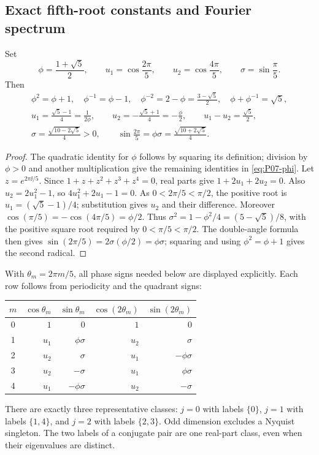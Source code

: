 \subsection{Exact fifth-root constants and Fourier spectrum}
\label{slot:P07-1}
\begin{lemma}
\label{lem:P07-trig}
Set
\begin{equation}
 \phi=\frac{1+\sqrt5}{2},\qquad
 u_1=\cos\frac{2\pi}{5},\qquad u_2=\cos\frac{4\pi}{5},\qquad
 \sigma=\sin\frac\pi5.
 \label{eq:P07-constants}
\end{equation}
Then
\begin{gather}
 \phi^2=\phi+1,\quad \phi^{-1}=\phi-1,\quad
 \phi^{-2}=2-\phi=\frac{3-\sqrt5}{2},\quad
 \phi+\phi^{-1}=\sqrt5,\label{eq:P07-phi}\\
 u_1=\frac{\sqrt5-1}{4}=\frac1{2\phi},\qquad
 u_2=-\frac{\sqrt5+1}{4}=-\frac\phi2,\qquad
 u_1-u_2=\frac{\sqrt5}{2},\label{eq:P07-cosines}\\
 \sigma=\frac{\sqrt{10-2\sqrt5}}4>0,\qquad
 \sin\frac{2\pi}{5}=\phi\sigma
       =\frac{\sqrt{10+2\sqrt5}}4.\label{eq:P07-sines}
\end{gather}
\end{lemma}
\begin{proof}
The quadratic identity for $\phi$ follows by squaring its definition;
division by $\phi>0$ and another multiplication give the remaining
identities in \eqref{eq:P07-phi}. Let $z=e^{2\pi\ii/5}$.
Since $1+z+z^2+z^3+z^4=0$, real parts give
$1+2u_1+2u_2=0$. Also $u_2=2u_1^2-1$, so
$4u_1^2+2u_1-1=0$. As $0<2\pi/5<\pi/2$, the positive root
is $u_1=(\sqrt5-1)/4$; substitution gives $u_2$ and their difference.
Moreover $\cos(\pi/5)=-\cos(4\pi/5)=\phi/2$.
Thus $\sigma^2=1-\phi^2/4=(5-\sqrt5)/8$, with the positive
square root required by $0<\pi/5<\pi/2$. The double-angle formula
then gives $\sin(2\pi/5)=2\sigma(\phi/2)=\phi\sigma$;
squaring and using $\phi^2=\phi+1$ gives the second radical.
\end{proof}

With $\theta_m=2\pi m/5$, all phase signs needed below are displayed
explicitly. Each row follows from periodicity and the quadrant signs:
\begin{center}
\begin{tabular}{@{}c r r r r@{}}
\toprule
$m$&$\cos\theta_m$&$\sin\theta_m$&$\cos(2\theta_m)$&$\sin(2\theta_m)$\\
\midrule
0&$1$&$0$&$1$&$0$\\
1&$u_1$&$\phi\sigma$&$u_2$&$\sigma$\\
2&$u_2$&$\sigma$&$u_1$&$-\phi\sigma$\\
3&$u_2$&$-\sigma$&$u_1$&$\phi\sigma$\\
4&$u_1$&$-\phi\sigma$&$u_2$&$-\sigma$\\
\bottomrule
\end{tabular}
\end{center}
There are exactly three representative classes: $j=0$ with labels
$\{0\}$, $j=1$ with labels $\{1,4\}$, and $j=2$ with labels
$\{2,3\}$. Odd dimension excludes a Nyquist singleton. The two labels
of a conjugate pair are one real-part class, even when their eigenvalues
are distinct.

